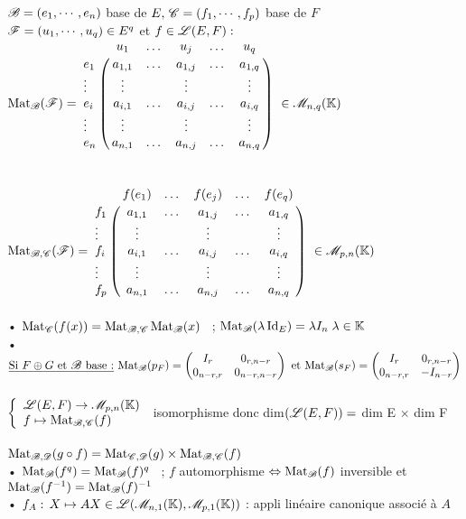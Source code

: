\documentclass[12 pt]{exampleclass}
\begin{document}
\begin{flushleft}
\begin{doublespace}

	$\mathscr{B} = (e_1,\cdots, e_n)$ base de $E, \, \mathscr{C} = (f_1,\cdots, f_p)$ base de $F$\\
	$\mathscr{F} = (u_1,\cdots , u_q) \in E^q$ et $f\in\mathscr{L}(E,F) :$\\
	$ \Mat_\sB (\sF) = \bordermatrix { & u_1 & \dots & u_j & \dots & u_q \cr e_1 & a_{1,1} & \dots & a_{1,j} & \dots & a_{1,q} \cr \vdots & \vdots &  &\vdots &  & \vdots \cr e_i & a_{i,1} & \dots & a_{i,j} & \dots & a_{i,q} \cr \vdots & \vdots &  &\vdots &  & \vdots \cr e_n & a_{n,1} & \dots & a_{n,j} & \dots & a_{n,q} \cr} \ \in \sM_{n,q}(\K)$\\
	\text{ }\\
	\text{ }\\
	$ \Mat_{\sB ,\sC} (\sF) = \bordermatrix { & f(e_1) & \dots & f(e_j) & \dots & f(e_q) \cr f_1 & a_{1,1} & \dots & a_{1,j} & \dots & a_{1,q} \cr \vdots & \vdots &  &\vdots &  & \vdots \cr f_i & a_{i,1} & \dots & a_{i,j} & \dots & a_{i,q} \cr \vdots & \vdots &  &\vdots &  & \vdots \cr f_p & a_{n,1} & \dots & a_{n,j} & \dots & a_{n,q} \cr} \ \in \sM_{p,n}(\K)$\\
	
	\text{ }\\
	• $\text{Mat}_{\mathscr{C}} (f(x)) = \text{Mat}_{\mathscr{B},\mathscr{C}}\, \text{Mat}_{\mathscr{B}} (x)$ \ ; $\text{Mat}_{\mathscr{B}} (\lambda\, \text{Id}_E) = \lambda I_n \; \lambda\in \mathbb{K}$\\
	• $\underline{\text{Si }F\oplus G\text{ et }\mathscr{B}\text{ base :}} \ \text{Mat}_{\mathscr{B}} (p_F) = \begin{pmatrix} I_r & 0_{r, n-r} \\ 0_{n - r, r} & 0_{n - r, n - r}\end{pmatrix} \text{ et } \text{Mat}_{\mathscr{B}}(s_F) = \begin{pmatrix} I_r & 0_{r, n-r} \\ 0_{n - r, r} & - I_{n - r}\end{pmatrix}$\\
	
	\text{ }\\
	 $\left\{\begin{array}{ll} \mathscr{L}(E,F) \rightarrow \mathscr{M}_{p,n}(\mathbb{K}) \\ f \mapsto \text{Mat}_{\mathscr{B},\mathscr{C}}(f) \end{array} \right.$ isomorphisme donc dim$(\mathscr{L}(E,F)) =$ dim E $\times$ dim F\\
	 \text{ }\\
	 $\text{Mat}_{\mathscr{B},\mathscr{D}}(g\circ f) = \text{Mat}_{\mathscr{C},\mathscr{D}}(g) \times \text{Mat}_{\mathscr{B},\mathscr{C}}(f)$\\
	• $\text{Mat}_{\mathscr{B}} (f^q) = \text{Mat}_{\mathscr{B}}(f)^q$ \ ; $f$ automorphisme $\Leftrightarrow \text{Mat}_{\mathscr{B}}(f)$ inversible et $\text{Mat}_{\mathscr{B}}(f^{- 1}) = \text{Mat}_{\mathscr{B}}(f)^{- 1}$\\
	• $f_A : \, X \mapsto AX \in\mathscr{L}(\mathscr{M}_{n,1}(\mathbb{K}),\mathscr{M}_{p, 1}(\mathbb{K}) )$ : appli linéaire canonique associé à $A$\\
	

\end{doublespace}
\end{flushleft}
\end{document}
